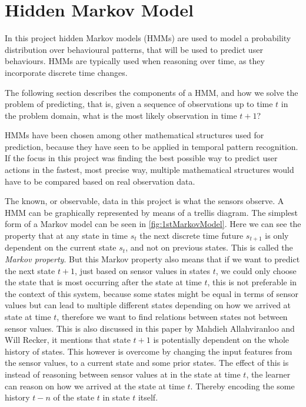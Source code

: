 \section{Hidden Markov Model}
\label{sec:hmm}
In this project hidden Markov models (HMMs) are used to model a probability distribution over behavioural patterns, that will be used to predict user behaviours. HMMs are typically used when reasoning over time, as they incorporate discrete time changes.

The following section describes the components of a HMM, and how we solve the problem of predicting, that is, given a sequence of observations up to time $t$ in the problem domain, what is the most likely observation in time $t+1$?

HMMs have been chosen among other mathematical structures used for prediction, because they have seen to be applied in temporal pattern recognition.
\\If the focus in this project was finding the best possible way to predict user actions in the fastest, most precise way, multiple mathematical structures would have to be compared based on real observation data.

The known, or observable, data in this project is what the sensors observe.
A HMM can be graphically represented by means of a trellis diagram\cite{russell2010artificial}. The simplest form of a Markov model can be seen in \cref{fig:1stMarkovModel}. Here we can see the property that at any state in time $s_t$ the next discrete time future $s_{t+1}$ is only dependent on the current state $s_t$, and not on previous states. This is called the \emph{Markov property}. But this Markov property also means that if we want to predict the next state $t+1$, just based on sensor values in states $t$, we could only choose the state that is most occurring after the state at time $t$, this is not preferable in the context of this system, because some states might be equal in terms of sensor values but can lead to multiple different states depending on how we arrived at state at time $t$, therefore we want to find relations between states not between sensor values. This is also discussed in this paper\cite{Allahviranloo201316} by Mahdieh Allahviranloo and Will Recker, it mentions that state $t+1$ is potentially dependent on the whole history of states. This however is overcome by changing the input features from the sensor values, to a current state and some prior states. The effect of this is instead of reasoning between sensor values at in the state at time $t$, the learner can reason on how we arrived at the state at time $t$. Thereby encoding the some history $t-n$ of the state $t$ in state $t$ itself.

